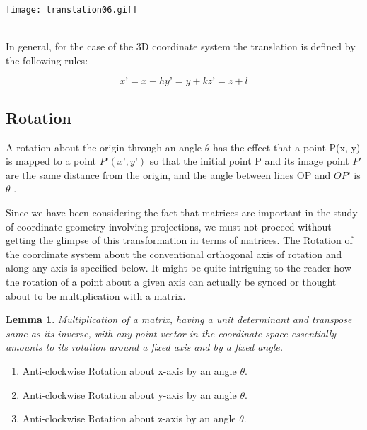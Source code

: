 \documentclass[12pt]{report}
\newtheorem{lemma}[theorem]{Lemma}
\begin{document}
\begin{center}
  \texttt{[image: translation06.gif]}
\end{center}
\\

In general, for the case of the 3D coordinate system the translation is defined by the following rules:

\[ 		x’ = x + h	y’ = y + k	z’ = z + l  \]

\subsection{Rotation}

A rotation about the origin through an angle $ \theta$ has the effect that a point P(x, y) is mapped to a point $ P’ (x’ , y’) $ so that the initial point P and its image point $ P' $ are the same distance from the origin, and the angle between lines OP and $ OP’ $ is $ \theta $ .
\vspace{0.3cm}

\hspace{1cm} Since we have been considering the fact that matrices are important in the study of coordinate geometry involving projections, we must not proceed without getting the glimpse of this transformation in terms of matrices. The Rotation of the coordinate system about the conventional orthogonal axis of rotation and along any axis is specified below.
\vspace{0.3cm}
It might be quite intriguing to the reader how the rotation of a point about a given axis can actually be synced or thought about to be multiplication with a matrix. 

\begin{lemma}
  Multiplication of a matrix, having a unit determinant and transpose same as its inverse, with any point vector in the coordinate space essentially amounts to its rotation around a fixed axis and by a fixed angle.
\end{lemma}



\begin{enumerate}
  \item Anti-clockwise Rotation about x-axis by an angle $\theta$.
  
  \item Anti-clockwise Rotation about y-axis by an angle $\theta$. 
  
  \item Anti-clockwise Rotation about z-axis by an angle $\theta$. 

\end{enumerate}
\end{document}
